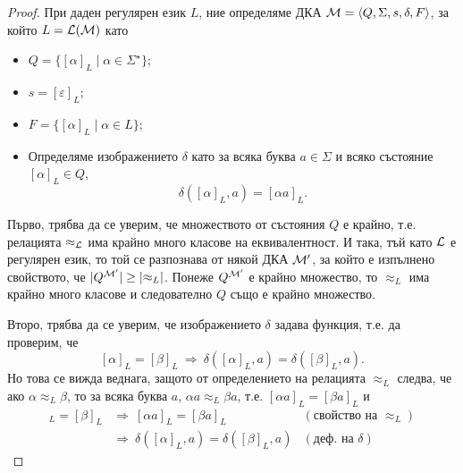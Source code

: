 \begin{proof}
  При даден регулярен език $L$, ние определяме ДКА $\mathcal{M} = \langle{Q,\Sigma,s,\delta,F}\rangle$, за който $L = \mathcal{L}(\mathcal{M})$ като
  \begin{itemize}
  \item
    $Q = \{[\alpha]_L\mid \alpha\in \Sigma^\star\}$;
  \item
    $s = [\varepsilon]_L$;
  \item
    $F = \{[\alpha]_L\mid \alpha\in L\}$;
  \item
    Определяме изображението $\delta$ като 
    за всяка буква $a \in \Sigma$ и всяко състояние $[\alpha]_L\in Q$, 
    \[\delta([\alpha]_L,a) = [\alpha a]_L.\]
  \end{itemize}
  
  Първо, трябва да се уверим, че множеството от състояния $Q$ е крайно, т.е.
  релацията $\approx_{\mathcal{L}}$ има крайно много класове на еквивалентност.
  И така, тъй като $\mathcal{L}$ е регулярен език, то той се разпознава от някой ДКА $\mathcal{M}^\prime$,
  за който е изпълнено свойството, че $\lvert{Q^{\mathcal{M}'}}\rvert \geq \lvert{\approx_L}\rvert$.
  Понеже $Q^{\mathcal{M}'}$ е крайно множество, то $\approx_L$ има крайно много класове и 
  следователно $Q$ също е крайно множество.

  Второ, трябва да се уверим, че изображението $\delta$ задава функция, т.е. 
  да проверим, че
  \[[\alpha]_L = [\beta]_L\ \Rightarrow\ \delta([\alpha]_L,a) = \delta([\beta]_L,a).\]
  Но това се вижда веднага, защото от определението на релацията $\approx_L$ следва, че
  ако $\alpha \approx_L \beta$, то за всяка буква $a$, $\alpha a \approx_L \beta a$,
  т.е. $[\alpha a]_L = [\beta a]_L$ и 
  \begin{align*}
    [\alpha]_L = [\beta]_L & \Rightarrow\ [\alpha a]_L = [\beta a]_L & (\text{свойство на }\approx_L)\\
    & \Rightarrow\ \delta([\alpha]_L,a) = \delta([\beta]_L,a) & (\text{деф. на }\delta)
  \end{align*}
  

\end{proof}
